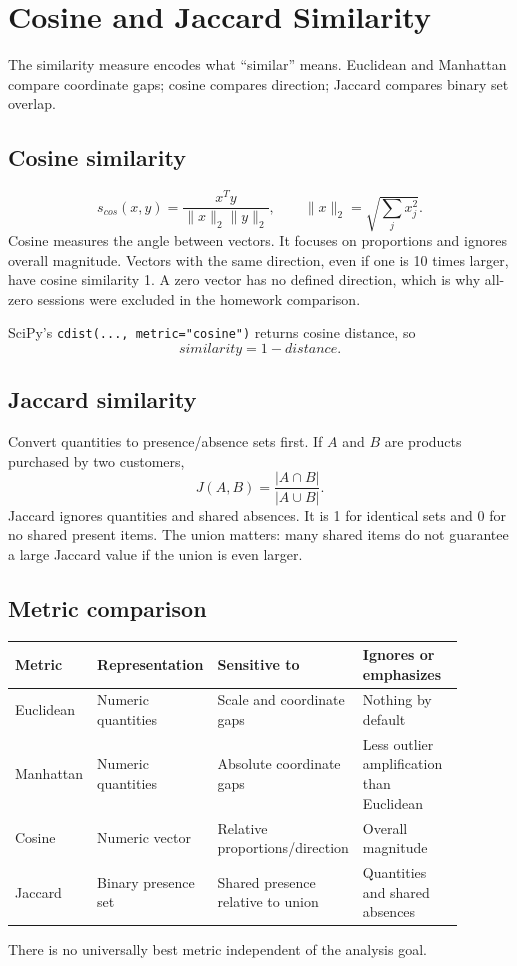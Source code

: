 \documentclass[11pt]{article}
\begin{document}
\section{Cosine and Jaccard Similarity}
The similarity measure encodes what ``similar'' means. Euclidean and Manhattan compare coordinate gaps; cosine compares direction; Jaccard compares binary set overlap.

\subsection{Cosine similarity}
\[
s_{cos}(x,y)=\frac{x^Ty}{\lVert x\rVert_2\lVert y\rVert_2},
\qquad
\lVert x\rVert_2=\sqrt{\sum_jx_j^2}.
\]
Cosine measures the angle between vectors. It focuses on proportions and ignores overall magnitude. Vectors with the same direction, even if one is 10 times larger, have cosine similarity 1. A zero vector has no defined direction, which is why all-zero sessions were excluded in the homework comparison.

SciPy's \texttt{cdist(..., metric="cosine")} returns cosine distance, so
\[
similarity = 1-distance.
\]

\subsection{Jaccard similarity}
Convert quantities to presence/absence sets first. If $A$ and $B$ are products purchased by two customers,
\[
J(A,B)=\frac{|A\cap B|}{|A\cup B|}.
\]
Jaccard ignores quantities and shared absences. It is 1 for identical sets and 0 for no shared present items. The union matters: many shared items do not guarantee a large Jaccard value if the union is even larger.

\subsection{Metric comparison}
\begin{center}
\small
\begin{tabular}{p{0.17\linewidth} p{0.22\linewidth} p{0.25\linewidth} p{0.25\linewidth}}
\toprule
\textbf{Metric} & \textbf{Representation} & \textbf{Sensitive to} & \textbf{Ignores or emphasizes} \\
\midrule
Euclidean & Numeric quantities & Scale and coordinate gaps & Nothing by default \\
Manhattan & Numeric quantities & Absolute coordinate gaps & Less outlier amplification than Euclidean \\
Cosine & Numeric vector & Relative proportions/direction & Overall magnitude \\
Jaccard & Binary presence set & Shared presence relative to union & Quantities and shared absences \\
\bottomrule
\end{tabular}
\end{center}
There is no universally best metric independent of the analysis goal.
\end{document}
